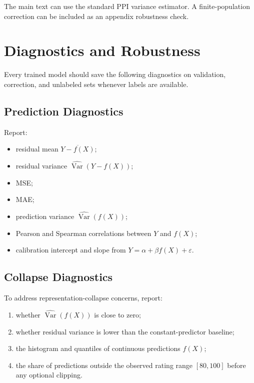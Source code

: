 \documentclass[11pt]{article}
\begin{document}
The main text can use the standard PPI variance estimator. A finite-population correction can be included as an appendix robustness check.

\section{Diagnostics and Robustness}

Every trained model should save the following diagnostics on validation, correction, and unlabeled sets whenever labels are available.

\subsection{Prediction Diagnostics}

Report:

\begin{itemize}
    \item residual mean $\overline{Y-f(X)}$;
    \item residual variance $\widehat{\operatorname{Var}}(Y-f(X))$;
    \item MSE;
    \item MAE;
    \item prediction variance $\widehat{\operatorname{Var}}(f(X))$;
    \item Pearson and Spearman correlations between $Y$ and $f(X)$;
    \item calibration intercept and slope from $Y=\alpha+\beta f(X)+\varepsilon$.
\end{itemize}

\subsection{Collapse Diagnostics}

To address representation-collapse concerns, report:

\begin{enumerate}
    \item whether $\widehat{\operatorname{Var}}(f(X))$ is close to zero;
    \item whether residual variance is lower than the constant-predictor baseline;
    \item the histogram and quantiles of continuous predictions $f(X)$;
    \item the share of predictions outside the observed rating range $[80,100]$ before any optional clipping.
\end{enumerate}
\end{document}
